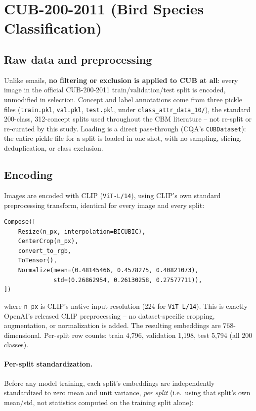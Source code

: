 \documentclass[11pt]{article}
\newcommand{\code}[1]{\texttt{#1}}
\begin{document}
\section{CUB-200-2011 (Bird Species Classification)}

\subsection{Raw data and preprocessing}
\label{sec:cub-preprocessing}

Unlike emails, \textbf{no filtering or exclusion is applied to CUB at
all}: every image in the official CUB-200-2011 train/validation/test split
is encoded, unmodified in selection. Concept and label annotations come
from three pickle files (\code{train.pkl}, \code{val.pkl}, \code{test.pkl},
under \code{class\_attr\_data\_10/}),
the standard 200-class, 312-concept splits used throughout the CBM
literature -- not re-split or re-curated by this study. Loading is a
direct pass-through (CQA's \code{CUBDataset}): the entire pickle file for a
split is loaded in one shot, with no sampling, slicing, deduplication, or
class exclusion.

\subsection{Encoding}

Images are encoded with CLIP (\code{ViT-L/14}), using CLIP's own standard
preprocessing transform, identical for every image and every split:

\begin{lstlisting}
Compose([
    Resize(n_px, interpolation=BICUBIC),
    CenterCrop(n_px),
    convert_to_rgb,
    ToTensor(),
    Normalize(mean=(0.48145466, 0.4578275, 0.40821073),
              std=(0.26862954, 0.26130258, 0.27577711)),
])
\end{lstlisting}

where \code{n\_px} is CLIP's native input resolution (224 for
\code{ViT-L/14}). This is exactly OpenAI's released CLIP preprocessing --
no dataset-specific cropping, augmentation, or normalization is added. The
resulting embeddings are 768-dimensional. Per-split row counts: train
4{,}796, validation 1{,}198, test 5{,}794 (all 200 classes).

\paragraph{Per-split standardization.} Before any model training, each
split's embeddings are independently standardized to zero mean and unit
variance, \emph{per split} (i.e.\ using that split's own mean/std, not
statistics computed on the training split alone):
\end{document}
